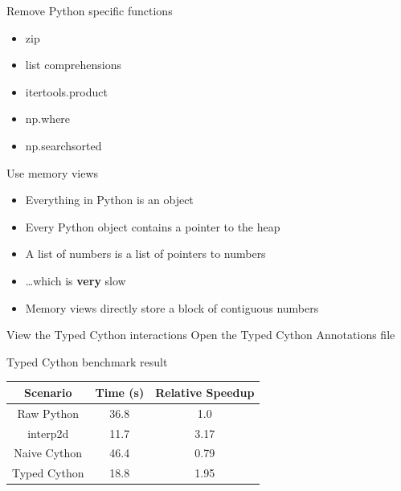 \documentclass[12pt,xcolor=dvipsnames]{beamer}
\begin{document}
    \begin{frame}{Remove Python specific functions}
        \begin{itemize}
            \item zip
            \item list comprehensions
            \item itertools.product
            \item np.where
            \item np.searchsorted
        \end{itemize}
    \end{frame}

    \begin{frame}{Use memory views}
        \begin{itemize}
            \item Everything in Python is an object
            \item Every Python object contains a pointer to the heap
            \item A list of numbers is a list of pointers to numbers
            \item \ldots which is \textbf{very} slow
            \item Memory views directly store a block of contiguous numbers
        \end{itemize}
    \end{frame}

    \begin{frame}{View the Typed Cython interactions}
        Open the Typed Cython Annotations file
    \end{frame}

    \begin{frame}{Typed Cython benchmark result}
        \begin{center}
        \begin{tabular}{ | c | c | c | }
            \hline
            Scenario & Time (s) & Relative Speedup \\
            \hline
            Raw Python & 36.8 & 1.0 \\
            interp2d & 11.7 & 3.17 \\
            Naive Cython & 46.4 & 0.79 \\
            Typed Cython & 18.8 & 1.95 \\
            \hline
        \end{tabular}
        \end{center}
    \end{frame}
\end{document}
